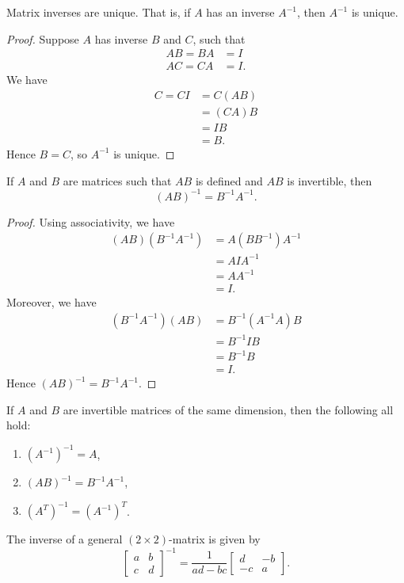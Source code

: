 \begin{theorem}
  Matrix inverses are unique. That is, if $A$ has an inverse $A^{-1}$, then $A^{-1}$ is unique.
\end{theorem}
\begin{proof}
  Suppose $A$ has inverse $B$ and $C$, such that
  \begin{align*}
    AB = BA &= I \\
    AC = CA &= I.
  \end{align*}
  We have 
  \begin{align*}
    C = CI &= C(AB) \\
           &= (CA)B \\
           &= IB \\
           &= B.
  \end{align*}
  Hence $B = C$, so $A^{-1}$ is unique.
\end{proof}
\begin{theorem}
  If $A$ and $B$ are matrices such that $AB$ is defined and $AB$ is invertible, then \[
    (AB)^{-1} = B^{-1}A^{-1}
  .\] 
\end{theorem}
\begin{proof}
  Using associativity, we have
  \begin{align*}
    (AB)(B^{-1}A^{-1}) &= A(BB^{-1})A^{-1} \\
                       &= AIA^{-1} \\
                       &= AA^{-1} \\
                       &= I.
  \end{align*}
  Moreover, we have 
  \begin{align*}
    (B^{-1}A^{-1})(AB) &= B^{-1}(A^{-1}A)B \\
                       &= B^{-1}IB \\
                       &= B^{-1}B \\
                       &= I.
  \end{align*}
  Hence $(AB)^{-1} = B^{-1}A^{-1}$.
\end{proof}
\begin{theorem}
  If $A$ and $B$ are invertible matrices of the same dimension, then the following all hold:
  \begin{enumerate}
    \item  $(A^{-1})^{-1} = A$,
    \item $(AB)^{-1} = B^{-1}A^{-1}$,
    \item $(A^{T})^{-1} = (A^{-1})^T$.
  \end{enumerate}
\end{theorem}
\begin{theorem}
  The inverse of a general $(2\times 2)$-matrix is given by 
  \begin{equation*}
    \begin{bmatrix}
      a & b \\ c & d
    \end{bmatrix}^{-1} = 
    \frac{1}{ad - bc}\begin{bmatrix}
      d & -b \\ -c & a
    \end{bmatrix}.
  \end{equation*}
\end{theorem}
